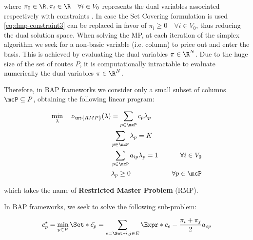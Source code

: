 where $\pi_0 \in \R, \pi_i \in \R \quad \forall i \in V_0$ represents the dual variables
associated respectively with constraints .
In case the Set Covering formulation is used \cref{eq:dmp-constraint3} can be replaced in favor of $\pi_i \ge 0 \quad \forall i \in V_0$,
thus reducing the dual solution space.
When solving the MP,
at each iteration of the simplex algorithm \parencite{dantzig1955} we seek for a non-basic variable (i.e. column)
to price out and enter the basis.
This is achieved by evaluating the dual variables $\pi \in \R^N$.
Due to the huge size of the set of routes $P$,
it is computationally intractable to evaluate numerically the dual variables $\pi \in \R^{N}$.

\medskip

Therefore, in BAP frameworks we consider only a small subset of columns $\mcP \subseteq P$,
obtaining the following linear program:

\begin{align}
	\min_{\lambda} \quad z_\mt{RMP}(\lambda) & = \sum_{p \in \mcP}  c_p \lambda_p \label{eq:rmp-obj-func}                                                                                                                              \\
	                                         & \sum_{p \in \mcP} \lambda_{p} = K\label{eq:rmp-K-routes}                                                                                                                                \\
	                                         & \sum_{p \in \mcP}  a_{ip} \lambda_p = 1                    & \quad \forall i \in V_0                                              \label{eq:rmp-customers-visited-by-exactly-one-route} \\
	                                         & \lambda_p \ge 0                                            & \quad \forall p \in \mcP \label{eq:rmp-lambda-mip-var-bounds}
\end{align}

which takes the name of \textbf{Restricted Master Problem} (RMP).

In BAP frameworks, we seek to solve the following sub-problem:

\begin{equation}\label{eq:pp-problem}
	{c^\star_p} = \min_{p \in P} \Set*{ \bar{c_p} = \sum_{e = \Set*{i, j} \in E} \Expr*{c_{e} - \frac{\pi_i + \pi_j}{2}} a_{ep}  }
\end{equation}


